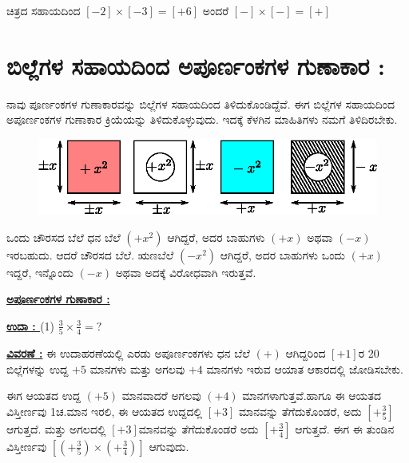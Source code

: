 ಚಿತ್ರದ ಸಹಾಯದಿಂದ $[-2]\times [-3]=[+6]$ ಅಂದರೆ $[-]\times [-]=[+]$

\section{ಬಿಲ್ಲೆಗಳ ಸಹಾಯದಿಂದ ಅಪೂರ್ಣಂಕಗಳ ಗುಣಾಕಾರ :}\label{sec3.3}%

ನಾವು ಪೂರ್ಣಂಕಗಳ ಗುಣಾಕಾರವನ್ನು ಬಿಲ್ಲೆಗಳ ಸಹಾಯದಿಂದ ತಿಳಿದುಕೊಂಡಿದ್ದೆವೆ. ಈಗ ಬಿಲ್ಲೆಗಳ ಸಹಾಯದಿಂದ ಅಪೂರ್ಣಂಕಗಳ ಗುಣಾಕಾರ ಕ್ರಿಯೆಯನ್ನು ತಿಳಿದುಕೊಳ್ಳುವುದು. ಇದಕ್ಕೆ ಕೆಳಗಿನ ಮಾಹಿತಿಗಳು ನಮಗೆ ತಿಳಿದಿರಬೇಕು.

\vspace{-.2cm}

\begin{figure}[H]
\centering
\includegraphics[scale=0.8]{src/figure/chap3/fig3-22.eps}
\end{figure}

\vspace{-.3cm}

ಒಂದು ಚೌರಸದ ಬೆಲೆ ಧನ ಬೆಲೆ $(+x^2)$ ಆಗಿದ್ದರೆ, ಅದರ ಬಾಹುಗಳು $(+x)$ ಅಥವಾ $(-x)$ ಇರಬಹುದು. ಆದರೆ ಚೌರಸದ ಬೆಲೆ. ಋಣಬೆಲೆ $(-x^2)$ ಆಗಿದ್ದರೆ, ಅದರ ಬಾಹುಗಳು ಒಂದು $(+x)$ ಇದ್ದರೆ, ಇನ್ನೊಂದು $(-x)$ ಅಥವಾ ಅದಕ್ಕೆ ವಿರೋಧವಾಗಿ ಇರುತ್ತವೆ.

\medskip
\noindent
{\textbf{\underline{ಅಪೂರ್ಣಂಕಗಳ ಗುಣಾಕಾರ :}}} 

\medskip
\noindent
{\textbf{\underline{ಉದಾ : }}} (1) $\frac{3}{5} \times \frac{3}{4} = ?$

\vspace{.2cm}

\noindent
{\textbf{\underline{ವಿವರಣೆ :}}} ಈ ಉದಾಹರಣೆಯಲ್ಲಿ ಎರಡು ಅಪೂರ್ಣಂಕಗಳು ಧನ ಬೆಲೆ $(+)$ ಆಗಿದ್ದರಿಂದ $[+1]$ರ 20 ಬಿಲ್ಲೆಗಳನ್ನು ಉದ್ದ $+5$ ಮಾನಗಳು ಮತ್ತು ಅಗಲವು $+4$ ಮಾನಗಳು ಇರುವ ಆಯಾತ ಆಕಾರದಲ್ಲಿ ಜೋಡಿಸಬೇಕು. 

ಈಗ ಆಯತದ ಉದ್ದ $(+5)$ ಮಾನವಾದರೆ ಅಗಲವು $(+4)$ ಮಾನಗಳಾಗುತ್ತವೆ.\break ಹಾಗೂ ಈ ಆಯತದ ವಿಸ್ತೀರ್ಣವು 1ಚ.ಮಾನ ಇರಲಿ, ಈ ಆಯತದ ಉದ್ದದಲ್ಲಿ $[+3]$ ಮಾನವನ್ನು ತೆಗೆದುಕೊಂಡರೆ, ಅದು $\left[+\frac{3}{5}\right]$ ಆಗುತ್ತದೆ. ಮತ್ತು ಅಗಲದಲ್ಲಿ $[+3]$ಮಾನವನ್ನು ತೆಗೆದುಕೊಂಡರೆ ಅದು $\left[+\frac{3}{4}\right]$ ಆಗುತ್ತದೆ. ಈಗ ಈ ತುಂಡಿನ ವಿಸ್ತೀರ್ಣವು $\left[\left(+ \frac{3}{5}\right) \times \left(+\frac{3}{4}\right)\right]$ ಆಗುವುದು. 

